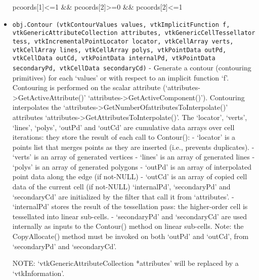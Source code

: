 \begin{itemize}
 
                     pcoords[1]<=1 \&\& pcoords[2]>=0 \&\& pcoords[2]<=1
 
 

\item  \verb|obj.Contour (vtkContourValues values, vtkImplicitFunction f, vtkGenericAttributeCollection attributes, vtkGenericCellTessellator tess, vtkIncrementalPointLocator locator, vtkCellArray verts, vtkCellArray lines, vtkCellArray polys, vtkPointData outPd, vtkCellData outCd, vtkPointData internalPd, vtkPointData secondaryPd, vtkCellData secondaryCd)| -  Generate a contour (contouring primitives) for each `values' or with
 respect to an implicit function `f'. Contouring is performed on the
 scalar attribute (`attributes->GetActiveAttribute()'
 `attributes->GetActiveComponent()').  Contouring interpolates the
 `attributes->GetNumberOfattributesToInterpolate()' attributes
 `attributes->GetAttributesToInterpolate()'.  The `locator', `verts',
 `lines', `polys', `outPd' and `outCd' are cumulative data arrays over
 cell iterations: they store the result of each call to Contour():
 - `locator' is a points list that merges points as they are inserted
  (i.e., prevents duplicates).
 - `verts' is an array of generated vertices
 - `lines' is an array of generated lines
 - `polys' is an array of generated polygons
 - `outPd' is an array of interpolated point data along the edge (if
 not-NULL)
 - `outCd' is an array of copied cell data of the current cell (if 
 not-NULL)
 `internalPd', `secondaryPd' and `secondaryCd' are initialized by the
 filter that call it from `attributes'.
 - `internalPd' stores the result of the tessellation pass: the
 higher-order cell is tessellated into linear sub-cells.
 - `secondaryPd' and `secondaryCd' are used internally as inputs to the
 Contour() method on linear sub-cells.
 Note: the CopyAllocate() method must be invoked on both `outPd' and
 `outCd', from `secondaryPd' and `secondaryCd'.

 NOTE: `vtkGenericAttributeCollection *attributes' will be replaced by a
       `vtkInformation'.

 
 
 
 
 
 
 
 
 
 


\end{itemize}
